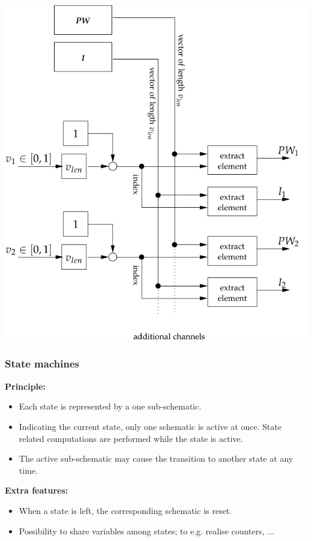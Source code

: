 \documentclass[serif,9pt,xcolor=dvipsnames]{beamer}
\begin{document}
\begin{frame}[fragile]
{     \begin{minipage}{0.55\linewidth}
\hspace{-1.8cm}
\vspace{2cm}
	\centering \includegraphics[width=1.0\linewidth]{figures/charge_control.pdf} 

     \end{minipage}    
  }

\end{frame}



\begin{frame}
  \frametitle{State machines}

  \textbf{Principle:}

  \begin{itemize}
   \item Each state is represented by a one sub-schematic. 
   \item Indicating the current state, only one schematic is active at once. State related computations are performed while the state is active.
   \item The active sub-schematic may cause the transition to another state at any time.
  \end{itemize}

  \textbf{Extra features:}
  \begin{itemize}
   \item When a state is left, the corresponding schematic is reset.
   \item Possibility to share variables among states; to e.g. realise counters, ...
  \end{itemize}

  
  

\end{frame}
\end{document}
